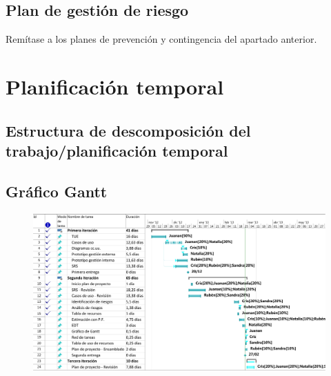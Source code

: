 \documentclass[11pt, a4paper, twoside, titlepage]{article}
\begin{document}
		\subsection{Plan de gestión de riesgo}
			Remítase a los planes de prevención y contingencia del apartado anterior.

	\section{Planificación temporal}		
		\subsection{Estructura de descomposición del trabajo/planificación temporal}
			 

		\begin{landscape}
		\subsection{Gráfico Gantt}
			\begin{figure}[h] \centering
			\vspace{1.1cm}
			\includegraphics[scale=.8]{planific/Gantt.pdf}
			\end{figure}
		\end{landscape}
\end{document}
